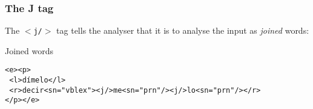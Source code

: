 \documentclass{beamer} %
\begin{document}
\begin{frame}
  \frametitle{The J tag}
  The {\tt $<$j/$>$} tag tells the analyser that it is to analyse the input as {\it joined} words:
  \begin{exampleblock}{Joined words}
    \begin{footnotesize}
    \begin{alltt}
      <e><p> \\
      ~<l>dímelo</l> \\
      ~<r>decir<s n="vblex"><j/>me<s n="prn"/><j/>lo<s n="prn"/></r> \\
      </p></e> \\
    \end{alltt}
    \end{footnotesize}
\end{exampleblock}
\end{frame}
\end{document}
